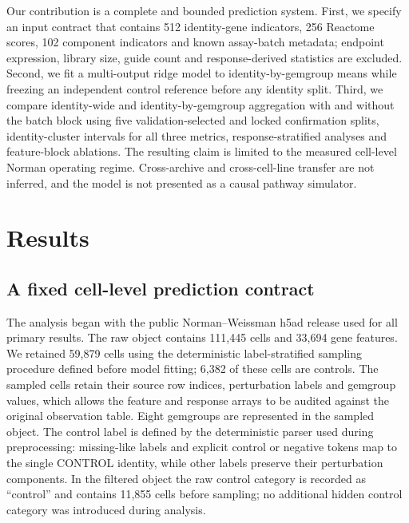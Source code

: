 \documentclass[10pt]{article}
\begin{document}
Our contribution is a complete and bounded prediction system. First, we specify an input contract that contains 512 identity-gene indicators, 256 Reactome scores, 102 component indicators and known assay-batch metadata; endpoint expression, library size, guide count and response-derived statistics are excluded. Second, we fit a multi-output ridge model to identity-by-gemgroup means while freezing an independent control reference before any identity split. Third, we compare identity-wide and identity-by-gemgroup aggregation with and without the batch block using five validation-selected and locked confirmation splits, identity-cluster intervals for all three metrics, response-stratified analyses and feature-block ablations. The resulting claim is limited to the measured cell-level Norman operating regime. Cross-archive and cross-cell-line transfer are not inferred, and the model is not presented as a causal pathway simulator.

\section{Results}
\subsection{A fixed cell-level prediction contract}
The analysis began with the public Norman--Weissman h5ad release used for all primary results. The raw object contains 111,445 cells and 33,694 gene features. We retained 59,879 cells using the deterministic label-stratified sampling procedure defined before model fitting; 6,382 of these cells are controls. The sampled cells retain their source row indices, perturbation labels and gemgroup values, which allows the feature and response arrays to be audited against the original observation table. Eight gemgroups are represented in the sampled object. The control label is defined by the deterministic parser used during preprocessing: missing-like labels and explicit control or negative tokens map to the single CONTROL identity, while other labels preserve their perturbation components. In the filtered object the raw control category is recorded as ``control'' and contains 11,855 cells before sampling; no additional hidden control category was introduced during analysis.
\end{document}
